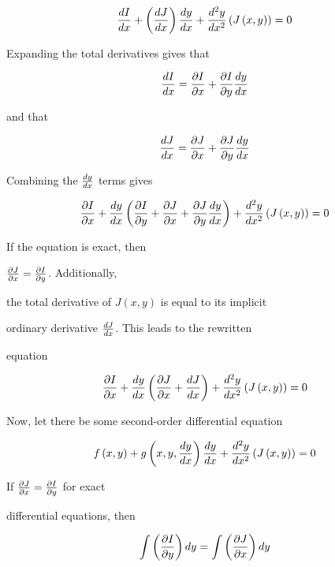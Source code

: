 $${dI \over dx} +\left({ dJ\over dx}\right){dy \over dx}+{d^2y \over dx^2}\left(J\left(x,y\right)\right)=0$$



Expanding the total derivatives gives that



$${dI \over dx}={\partial I\over\partial x}+{\partial I\over\partial y}{dy \over dx}$$



and that



$${dJ \over dx}={\partial J\over\partial x}+{\partial J\over\partial y}{dy \over dx}$$



Combining the ${dy \over dx}$ terms gives



$${\partial I\over\partial x}+{dy \over dx}\left({\partial I\over\partial y}+{\partial J\over\partial x}+{\partial J\over\partial y}{dy \over dx}\right)+{d^2y \over dx^2}\left(J\left(x,y\right)\right)=0$$



If the equation is exact, then

${\partial J\over\partial x}={\partial I\over\partial y}$. Additionally,

the total derivative of $J\left(x,y\right)$ is equal to its implicit

ordinary derivative ${dJ \over dx}$. This leads to the rewritten

equation



$${\partial I\over\partial x}+{dy \over dx}\left({\partial J\over\partial x}+{dJ \over dx}\right)+{d^2y \over dx^2}\left(J\left(x,y\right)\right)=0$$



Now, let there be some second-order differential equation



$$f\left(x,y\right)+g\left(x,y,{dy \over dx}\right){dy \over dx}+{d^2y \over dx^2}\left(J\left(x,y\right)\right)=0$$



If ${\partial J\over\partial x}={\partial I\over\partial y}$ for exact

differential equations, then



$$\int \left({\partial I\over\partial y}\right)dy=\int \left({\partial J\over\partial x}\right)dy$$



